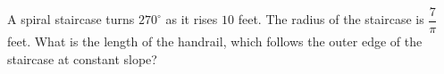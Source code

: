 A spiral staircase turns $270^\circ$ as it rises $10$ feet. The radius of the staircase is $\dfrac{7}{\pi}$ feet. What is the length of the handrail, which follows the outer edge of the staircase at constant slope?
